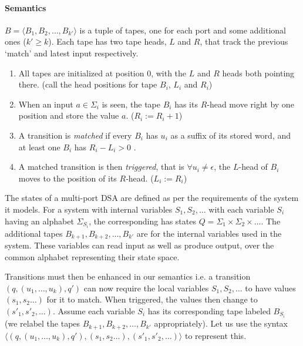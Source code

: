 \paragraph*{Semantics} $B=\langle B_1,B_2,\dots,B_{k'} \rangle$ is a tuple of tapes, one for each port and some additional ones ($k'\ge k$). Each tape has two tape heads, $L$ and $R$, that track the previous `match' and latest input respectively. 

\begin{enumerate}
\item All tapes are initialized at position 0, with the $L$ and $R$ heads both pointing there. (call the head positions for tape $B_i$, $L_i$ and $R_i$)

\item When an input $a \in \Sigma_i$ is seen, the tape $B_i$ has its $R$-head move right by one position and store the value $a$. ($R_i := R_i+1$)

\item A transition is \emph{matched} if every $B_i$ has $u_i$ as a suffix of its stored word, and at least one $B_i$ has $R_i-L_i>0$ . %

\item A matched transition is then \emph{triggered}, that is $\forall u_i \ne \epsilon$, the $L$-head of $B_i$ moves to the position of its $R$-head. ($L_i := R_i$)
\end{enumerate}

The states of a multi-port DSA are defined as per the requirements of the system it models. For a system with internal variables $S_1,S_2,\dots$ with each variable $S_i$ having an alphabet $\Sigma_{S_i}$, the corresponding \mdsa has states $Q=\Sigma_1 \times \Sigma_2 \times \dots$. The additional tapes $B_{k+1}, B_{k+2}, \dots, B_{k'}$ are for the internal variables used in the system. These variables can read input as well as produce output, over the common alphabet representing their state space. %

Transitions must then be enhanced in our semantics i.e.  a transition $(q, (u_1, \dots, u_k), q')$ can now require the local variables $S_1, S_2,\dots$ to have values $(s_1, s_2 \dots)$  for it to match. When triggered, the values then change to $(s'_1,s'_2,\dots)$. Assume each variable $S_i$ has its corresponding tape labeled $B_{S_i}$ (we relabel the tapes $B_{k+1}, B_{k+2}, \dots, B_{k'}$ appropriately). Let us use the syntax $\langle (q, (u_1, \dots, u_k), q') , (s_1, s_2 \dots), (s'_1,s'_2,\dots) \rangle$ to represent this.

